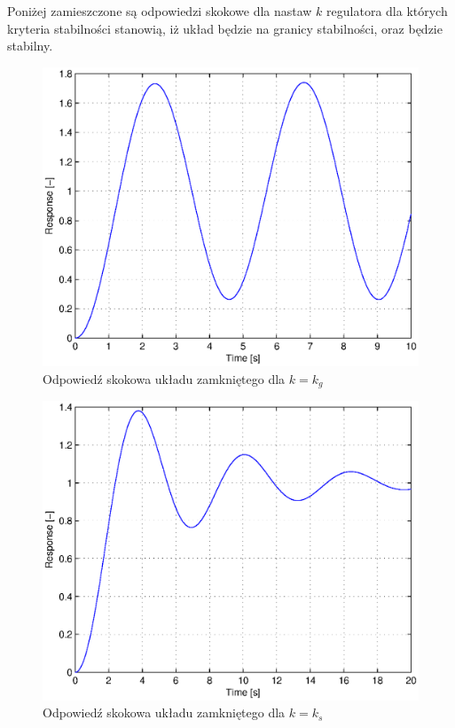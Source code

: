 \documentclass[12pt]{article}
\begin{document}
Poniżej zamieszczone są odpowiedzi skokowe dla nastaw $k$ regulatora dla których
kryteria stabilności stanowią, iż układ będzie na granicy stabilności, oraz
będzie stabilny.

\begin{figure}[!htb]
	\begin{center}
		\includegraphics[width=12cm]{../res/img/0,3-1-0,5_resp.eps} 
	\end{center}
	\caption{Odpowiedź skokowa układu zamkniętego dla $k=k_g$}
\end{figure}

\begin{figure}[!htb]
	\begin{center}
		\includegraphics[width=12cm]{../res/img/0,1-1-0,5_resp.eps} 
	\end{center}
	\caption{Odpowiedź skokowa układu zamkniętego dla $k=k_s$}
\end{figure}
\end{document}
